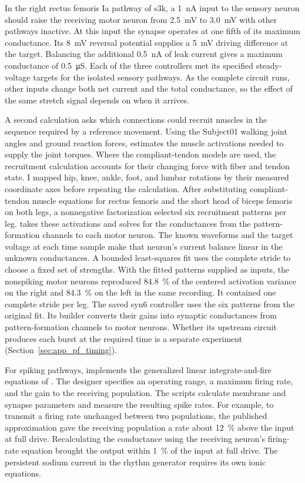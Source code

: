 In the right rectus femoris Ia pathway of s3k, a \qty{1}{\nano\ampere} input to the sensory neuron should raise the receiving motor neuron from \qty{2.5}{\milli\volt} to \qty{3.0}{\milli\volt} with other pathways inactive. At this input the synapse operates at one fifth of its maximum conductance. Its \qty{8}{\milli\volt} reversal potential supplies a \qty{5}{\milli\volt} driving difference at the target. Balancing the additional \qty{0.5}{\nano\ampere} of leak current gives a maximum conductance of \qty{0.5}{\micro\siemens}. Each of the three controllers met its specified steady-voltage targets for the isolated sensory pathways. As the complete circuit runs, other inputs change both net current and the total conductance, so the effect of the same stretch signal depends on when it arrives.

A second calculation asks which connections could recruit muscles in the sequence required by a reference movement. Using the Subject01 walking joint angles and ground reaction forces,  estimates the muscle activations needed to supply the joint torques. Where the compliant-tendon models are used, the recruitment calculation accounts for their changing force with fiber and tendon state. I mapped hip, knee, ankle, foot, and lumbar rotations by their measured coordinate axes before repeating the calculation. After substituting compliant-tendon muscle equations for rectus femoris and the short head of biceps femoris on both legs, a nonnegative factorization selected six recruitment patterns per leg.  takes these activations and solves for the conductances from the pattern-formation channels to each motor neuron. The known waveforms and the target voltage at each time sample make that neuron's current balance linear in the unknown conductances. A bounded least-squares fit uses the complete stride to choose a fixed set of strengths. With the fitted patterns supplied as inputs, the nonspiking motor neurons reproduced \qty{84.8}{\percent} of the centered activation variance on the right and \qty{84.3}{\percent} on the left in the same recording. It contained one complete stride per leg. The saved syn6 controller uses the six patterns from the original fit. Its builder converts their gains into synaptic conductances from pattern-formation channels to motor neurons. Whether its upstream circuit produces each burst at the required time is a separate experiment (Section~\ref{sec:app_pf_timing}).

For spiking pathways,  implements the generalized linear integrate-and-fire equations of \citet{szczecinski_extending_2020}. The designer specifies an operating range, a maximum firing rate, and the gain to the receiving population. The scripts calculate membrane and synapse parameters and measure the resulting spike rates. For example, to transmit a firing rate unchanged between two populations, the published approximation gave the receiving population a rate about \qty{12}{\percent} above the input at full drive. Recalculating the conductance using the receiving neuron’s firing-rate equation brought the output within \qty{1}{\percent} of the input at full drive. The persistent sodium current in the rhythm generator requires its own ionic equations.

